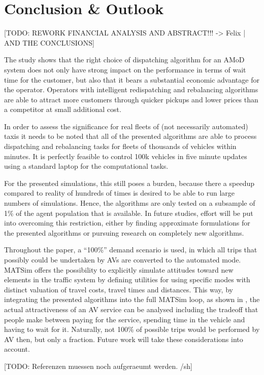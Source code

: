 \section{Conclusion \& Outlook}
\label{sec:Conclusion}

[TODO: REWORK FINANCIAL ANALYSIS AND ABSTRACT!!! -> Felix | AND THE CONCLUSIONS]

The study shows that the right choice of dispatching algorithm for an AMoD system
does not only have strong impact on the performance in terms of wait time for
the customer, but also that it bears a substantial economic advantage for the
operator. Operators with intelligent redispatching and rebalancing algorithms are able to attract
more customers through quicker pickups and lower prices than a competitor at small additional cost.

In order to assess the significance for real fleets of (not necessarily
automated) taxis it needs to be noted that all of the presented algorithms are
able to process dispatching and rebalancing tasks for fleets of thousands of
vehicles within minutes. It is perfectly feasible to control 100k vehicles in
five minute updates using a standard laptop for the computational tasks.

For the presented simulations, this still poses a burden, because there
a speedup compared to reality of hundreds of times is desired to be able
to run large numbers of simulations. Hence, the algorithms
are only tested on a subsample of 1\% of the agent population that is available.
In future studies, effort will be put into overcoming this restriction, either
by finding approximate formulations for the presented algorithms or pursuing research
on completely new algorithms.

Throughout the paper, a ``100\%'' demand scenario is used, in which all
trips that possibly could be undertaken by AVs are converted to the automated
mode. MATSim offers the possibility to explicitly
simulate attitudes toward new elements in the traffic system by defining utilities
for using specific modes with distinct valuation of travel costs, travel times and
distances. This way, by integrating the presented algorithms into the full
MATSim loop, as shown in \cite{horl_abmtrans17}, the actual attractiveness of an
AV service can be analysed including the tradeoff that people make between
paying for the service, spending time in the vehicle and having to wait for it.
Naturally, not 100\% of possible trips would be performed by AV then, but only
a fraction. Future work will take these considerations into account.

[TODO: Referenzen muessen noch aufgeraeumt werden. /sh]
